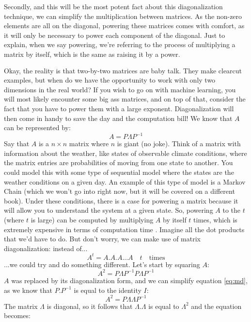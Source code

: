 \documentclass[600paper, 11pt,twoside,openany]{kdp}
\begin{document}
\indent Secondly, and this will be the most potent fact about this diagonalization technique, we can simplify the multiplication between  matrices. As the non-zero elements are all on the diagonal, powering these matrices comes with comfort, as it will only be necessary to power each component of the diagonal. Just to explain, when we say powering, we’re referring to the process of multiplying a matrix by itself, which is the same as raising it by a power.
\par 
\vspace{-3pt}
\indent Okay, the reality is that two-by-two matrices are baby talk. They make clearcut examples, but when do we have the opportunity to work with only two dimensions in the real world? If you wish to go on with machine learning, you will most likely encounter some big ass matrices, and on top of that, consider the fact that you have to power them with a large exponent. Diagonalization will then come in handy to save the day and the computation bill! We know that $A$ can be represented by:
\[A = P \Lambda P^{-1}\]
\indent Say that $A$ is a $n \times n$ matrix where $n$ is giant (no joke). Think of a matrix with information about the weather, like states of observable climate conditions, where the matrix entries are probabilities of moving from one state to another. You could model this with some type of sequential model where the states are the weather conditions on a given day. An example of this type of model is a Markov Chain (which we won’t go into right now, but it will be covered on a different book). Under these conditions, there is a case for powering a matrix because it will allow you to understand the system at a given state. So, powering $A$ to the $t$ (where $t$ is large) can be computed by multiplying $A$ by itself $t$ times, which is extremely expensive in terms of computation time . Imagine all the dot products that we’d have to do. But don’t worry, we can make use of matrix diagonalization: instead of...
\[A^t = A.A.A...A \quad t \quad \textrm{times}\]
\indent ...we could try and do something different. Let’s start by squaring $A$:
\begin{equation}\label{eq:md}
A^2  = P \Lambda P^{-1} P \Lambda P^{-1}
\end{equation}
\indent $A$ was replaced by its diagonalization form, and we can simplify equation \ref{eq:md}, as we know that $P.P^{-1}$ is equal to the identity $I$:
\[A^2  = P \Lambda \Lambda P^{-1}\]
\indent The matrix $\Lambda$ is diagonal, so it follows that $\Lambda$.$\Lambda$ is equal to $\Lambda^2$ and the equation becomes:
\end{document}
